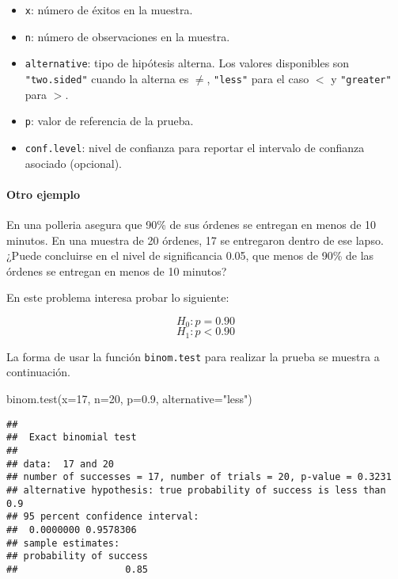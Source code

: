 \documentclass[
]{article}
\newenvironment{Shaded}{}{}
\newcommand{\AttributeTok}[1]{\textcolor[rgb]{0.49,0.56,0.16}{#1}}
\newcommand{\DecValTok}[1]{\textcolor[rgb]{0.25,0.63,0.44}{#1}}
\newcommand{\FloatTok}[1]{\textcolor[rgb]{0.25,0.63,0.44}{#1}}
\newcommand{\FunctionTok}[1]{\textcolor[rgb]{0.02,0.16,0.49}{#1}}
\newcommand{\NormalTok}[1]{#1}
\newcommand{\StringTok}[1]{\textcolor[rgb]{0.25,0.44,0.63}{#1}}
\providecommand{\tightlist}{%
  \setlength{\itemsep}{0pt}\setlength{\parskip}{0pt}}
\begin{document}
\begin{itemize}
\tightlist
\item
  \texttt{x}: número de éxitos en la muestra.
\item
  \texttt{n}: número de observaciones en la muestra.
\item
  \texttt{alternative}: tipo de hipótesis alterna. Los valores
  disponibles son \texttt{"two.sided"} cuando la alterna es \(\neq\),
  \texttt{"less"} para el caso \(<\) y \texttt{"greater"} para \(>\).
\item
  \texttt{p}: valor de referencia de la prueba.
\item
  \texttt{conf.level}: nivel de confianza para reportar el intervalo de
  confianza asociado (opcional).
\end{itemize}

\hypertarget{otro-ejemplo}{%
\paragraph{Otro ejemplo}\label{otro-ejemplo}}

En una polleria asegura que 90\% de sus órdenes se entregan en menos de
10 minutos. En una muestra de 20 órdenes, 17 se entregaron dentro de ese
lapso. ¿Puede concluirse en el nivel de significancia 0.05, que menos de
90\% de las órdenes se entregan en menos de 10 minutos?

En este problema interesa probar lo siguiente:

\[H_0: p = 0.90\] \[H_1: p < 0.90\]

La forma de usar la función \texttt{binom.test} para realizar la prueba
se muestra a continuación.

\begin{Shaded}
\begin{Highlighting}[]
\FunctionTok{binom.test}\NormalTok{(}\AttributeTok{x=}\DecValTok{17}\NormalTok{, }\AttributeTok{n=}\DecValTok{20}\NormalTok{, }\AttributeTok{p=}\FloatTok{0.9}\NormalTok{, }\AttributeTok{alternative=}\StringTok{"less"}\NormalTok{)}
\end{Highlighting}
\end{Shaded}

\begin{verbatim}
## 
##  Exact binomial test
## 
## data:  17 and 20
## number of successes = 17, number of trials = 20, p-value = 0.3231
## alternative hypothesis: true probability of success is less than 0.9
## 95 percent confidence interval:
##  0.0000000 0.9578306
## sample estimates:
## probability of success 
##                   0.85
\end{verbatim}
\end{document}
